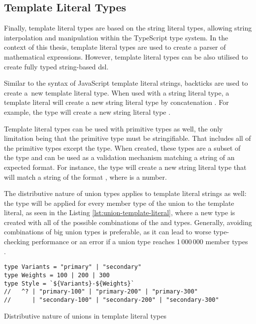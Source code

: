 \subsection{Template Literal Types}

Finally, template literal types are based on the string literal types, allowing string interpolation and manipulation within the TypeScript type system. In the context of this thesis, template literal types are used to create a parser of mathematical expressions. However, template literal types can be also utilised to create fully typed string-based \acrfull{dsl}.

Similar to the syntax of JavaScript template literal strings, backticks are used to create a~new template literal type. When used with a string literal type, a template literal will create a new string literal type by concatenation \cite{DocumentationTemplateLiteral}. For example, the type  will create a new string literal type .

Template literal types can be used with primitive types as well, the only limitation being that the primitive type must be stringifiable. That includes all of the primitive types except the  type. When created, these types are a subset of the  type and can be used as a validation mechanism matching a string of an expected format. For instance, the type  will create a new string literal type that will match a string of the format , where  is a number.

The distributive nature of union types applies to template literal strings as well: the type will be applied for every member type of the union to the template literal, as seen in the Listing \ref{lst:union-template-literal}, where a new  type is created with all of the possible combinations of the  and  types. Generally, avoiding combinations of big union types is preferable, as it can lead to worse type-checking performance or an error if a union type reaches 1\,000\,000 member types \cite{ImplementationCheckerTs2023}.

\begin{listing}[ht]
  \begin{verbatim}
type Variants = "primary" | "secondary"
type Weights = 100 | 200 | 300
type Style = `${Variants}-${Weights}`
//   ^? | "primary-100" | "primary-200" | "primary-300" 
//      | "secondary-100" | "secondary-200" | "secondary-300"
\end{verbatim}
  \caption{Distributive nature of unions in template literal types}\label{lst:union-template-literal}
\end{listing}

